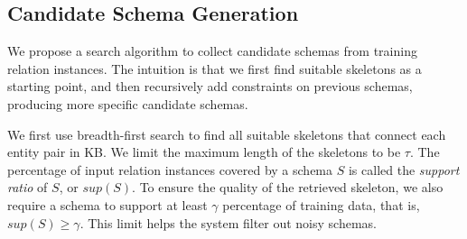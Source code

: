 \subsection{Candidate Schema Generation}
\label{sec:candgen}

We propose a search algorithm to collect 
candidate schemas from training relation instances.
The intuition is that we first find suitable skeletons 
as a starting point, and then recursively add constraints on 
previous schemas, producing more specific candidate schemas.



We first use breadth-first search 
to find all suitable skeletons that connect each entity pair in KB.
We limit the maximum length of the skeletons to be $\tau$.
The percentage of input relation instances covered by a schema $S$ 
is called the {\em support ratio} of $S$, or $sup(S)$.
To ensure the quality of the retrieved skeleton, we also require a schema
to support at least $\gamma$ percentage of training data, that is,
$sup(S) \ge \gamma$. 
This limit helps the system filter out noisy schemas. 





